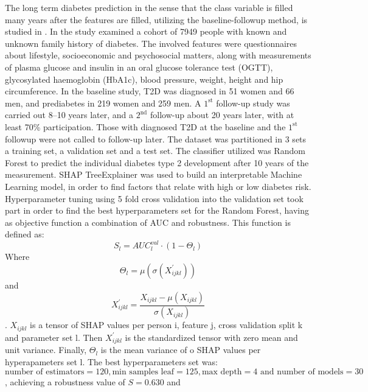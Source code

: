 \documentclass[journal,article,submit,pdftex,moreauthors]{Definitions/mdpi}
\begin{document}
\par The long term diabetes prediction in the sense  that the class variable is filled
many years after the features are filled, utilizing the baseline-followup method, is 
studied in \cite{LAMA2021e07419, Shin,Mao,fazakis, ijerph18063317}. In \cite{LAMA2021e07419} the study examined a cohort
of 7949 people with known and unknown family history of diabetes. The involved features 
were questionnaires about lifestyle, socioeconomic and psychosocial matters, along
with measurements of plasma glucose and insulin in an oral glucose
tolerance test (OGTT), glycosylated haemoglobin (HbA1c), blood pressure,
weight, height and hip circumference. In the baseline study, T2D
was diagnosed in 51 women and 66 men, and prediabetes in 219 women
and 259 men. A $1^{\textrm{st}}$ follow-up study was carried out 8–10 years later,
and a $2^{\textrm{nd}}$ follow-up about 20 years later, with at least 70\% participation.
Those with diagnosed T2D at the baseline and the $1^{\textrm{st}}$ followup
were not called to follow-up later. The dataset was partitioned
in 3 sets a training set, a validation set and a test set. The classifier utilized was Random 
Forest to predict the individual diabetes type 2 development after 10 years of the measurement.
SHAP TreeExplainer was used to build an interpretable Machine Learning model, in order to find 
factors that relate with high or low diabetes risk. Hyperparameter tuning using 5 fold cross 
validation into the validation set took part in order to find the best hyperparameters set for 
the Random Forest, having as objective function a combination of AUC and robustness. This
function is defined as: 
\begin{equation}\label{eq:objective_sweden}
	S_l=AUC_{l}^{val}\cdot(1-\Theta_{l})
\end{equation}
Where
\begin{equation}
	\Theta_{l}=\mu(\sigma(X_{ijkl}^{'}))
\end{equation} 
and 
\begin{equation}
	X_{ijkl}^{'}=\frac{X_{ijkl}-\mu(X_{ijkl})}{\sigma(X_{ijkl})}
\end{equation}.
$X_{ijkl}$ is a tensor of SHAP values per person i, feature j, cross
validation split k and parameter set l. Then $X_{ijkl}^{'}$ is the standardized
tensor with zero mean and unit variance. Finally, $\Theta_{l}$ is the mean
variance of o SHAP values per hyperapameters set l. The best hyperparameters
set was: $\textrm{number of estimators} = 120, \textrm{min samples leaf}=125, \textrm{max depth}=4 \textrm{ and
number of models} = 30 $, achieving a robustness value of $ S=0.630 $ and
\end{document}
